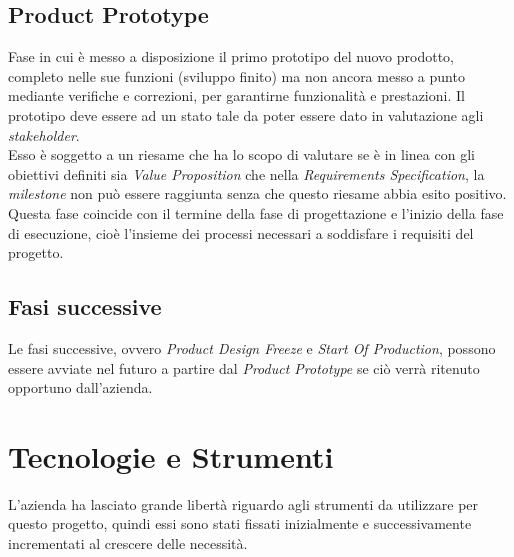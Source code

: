 \subsection{Product Prototype}
Fase in cui è messo a disposizione il primo prototipo del nuovo prodotto, completo nelle sue funzioni (sviluppo finito) ma non ancora messo a punto mediante verifiche e correzioni, per garantirne funzionalità e prestazioni. Il prototipo deve essere ad un stato tale da poter essere dato in valutazione agli \emph{stakeholder}.\\
Esso è soggetto a un riesame che ha lo scopo di valutare se è in linea con gli obiettivi definiti sia \emph{Value Proposition} che nella \emph{Requirements Specification}, la \emph{milestone} non può essere raggiunta senza che questo riesame abbia esito positivo.\\
Questa fase coincide con il termine della fase di progettazione e l'inizio della fase di esecuzione, cioè l'insieme dei processi necessari a soddisfare i requisiti del progetto.

\subsection{Fasi successive}
Le fasi successive, ovvero \emph{Product Design Freeze} e \emph{Start Of Production}, possono essere avviate nel futuro a partire dal \emph{Product Prototype} se ciò verrà ritenuto opportuno dall'azienda.

\section{Tecnologie e Strumenti}
L'azienda ha lasciato grande libertà riguardo agli strumenti da utilizzare per questo progetto, quindi essi sono stati fissati inizialmente e successivamente incrementati al crescere delle necessità.

